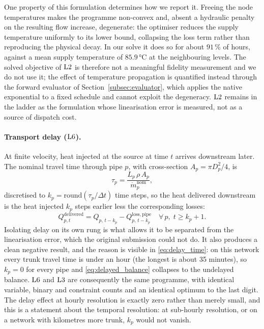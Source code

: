 One property of this formulation determines how we report it. Freeing the node temperatures
makes the programme non-convex and, absent a hydraulic penalty on the resulting flow
increase, degenerate: the optimiser reduces the supply temperature uniformly to its lower
bound, collapsing the loss term rather than reproducing the physical decay. In our solve it
does so for about $91$\,\% of hours, against a mean supply temperature of $85.9$\,°C at the
neighbouring levels. The solved objective of $\mathrm{L2}$ is therefore not a meaningful fidelity
measurement and we do not use it; the effect of temperature propagation is quantified
instead through the forward evaluator of Section~\ref{subsec:evaluator}, which applies the
native exponential to a fixed schedule and cannot exploit the degeneracy. $\mathrm{L2}$ remains in
the ladder as the formulation whose linearisation error is measured, not as a source of
dispatch cost.

\paragraph{Transport delay ($\mathrm{L6}$).}
At finite velocity, heat injected at the source at time $t$ arrives downstream later. The
nominal travel time through pipe $p$, with cross-section $A_p = \pi D_p^2/4$, is
%
\begin{equation}
  \tau_p = \frac{L_p\, \rho\, A_p}{\dot{m}_p^{\mathrm{nom}}},
  \label{eq:delay_time}
\end{equation}
%
discretised to $k_p = \mathrm{round}(\tau_p/\Delta t)$ time steps, so the heat delivered
downstream is the heat injected $k_p$ steps earlier less the corresponding losses:
%
\begin{equation}
  Q_{p,t}^{\mathrm{delivered}} =
    Q_{p,\,t-k_p} - Q_{p,\,t-k_p}^{\mathrm{loss,pipe}}
  \quad \forall\, p,\; t \geq k_p{+}1.
  \label{eq:delayed_balance}
\end{equation}
%
Isolating delay on its own rung is what allows it to be separated from the linearisation
error, which the original submission could not do. It also produces a clean negative
result, and the reason is visible in \eqref{eq:delay_time}: on this network every trunk
travel time is under an hour (the longest is about 35 minutes), so $k_p = 0$ for every
pipe and \eqref{eq:delayed_balance} collapses to the undelayed balance. $\mathrm{L6}$ and
$\mathrm{L3}$ are consequently the same programme, with identical variable, binary and
constraint counts and an identical optimum to the last digit. The delay effect at hourly
resolution is exactly zero rather than merely small, and this is a statement about the
temporal resolution: at sub-hourly resolution, or on a network with kilometres more trunk,
$k_p$ would not vanish.
